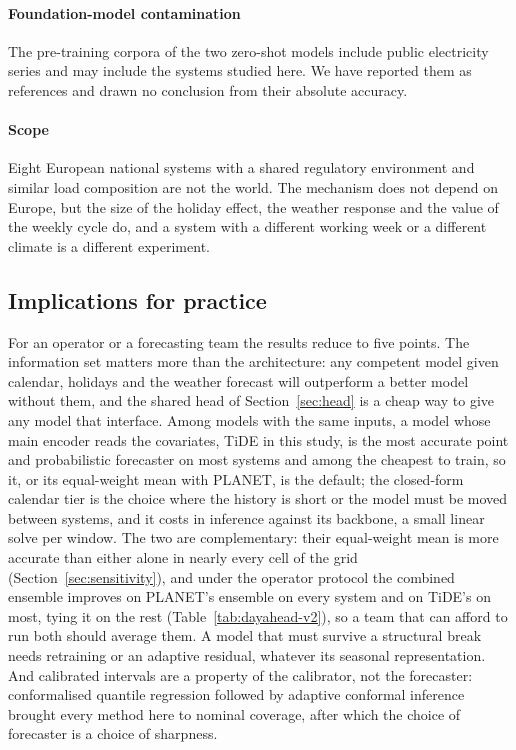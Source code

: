 \paragraph{Foundation-model contamination} The pre-training corpora of the two zero-shot
models include public electricity series and may include the systems studied here. We have
reported them as references and drawn no conclusion from their absolute accuracy.

\paragraph{Scope} Eight European national systems with a shared regulatory environment and
similar load composition are not the world. The mechanism does not depend on Europe, but the
size of the holiday effect, the weather response and the value of the weekly cycle do, and a
system with a different working week or a different climate is a different experiment.

\subsection{Implications for practice}
For an operator or a forecasting team the results reduce to five points. The information set
matters more than the architecture: any competent model given calendar, holidays and the
weather forecast will outperform a better model without them, and the shared head of
Section~\ref{sec:head} is a cheap way to give any model that interface. Among models with the same inputs, a model whose main encoder reads the covariates, TiDE in
this study, is the most accurate point and probabilistic forecaster on most systems and among
the cheapest to train, so it, or its equal-weight mean with PLANET, is the default; the
closed-form calendar tier is the choice where the history is short or the model must be moved
between systems, and it costs  in inference against its
backbone, a small linear solve per window. The two are complementary: their equal-weight mean is more accurate than
either alone in nearly every cell of the grid (Section~\ref{sec:sensitivity}), and under the
operator protocol the combined ensemble improves on PLANET's ensemble on every system and on
TiDE's on most, tying it on the rest (Table~\ref{tab:dayahead-v2}), so a team that can afford
to run both should average them. A
model that must survive a structural break needs retraining or an adaptive residual, whatever
its seasonal representation. And calibrated intervals are a property of the calibrator, not the
forecaster: conformalised quantile regression followed by adaptive conformal inference brought
every method here to nominal coverage, after which the choice of forecaster is a choice of
sharpness.
